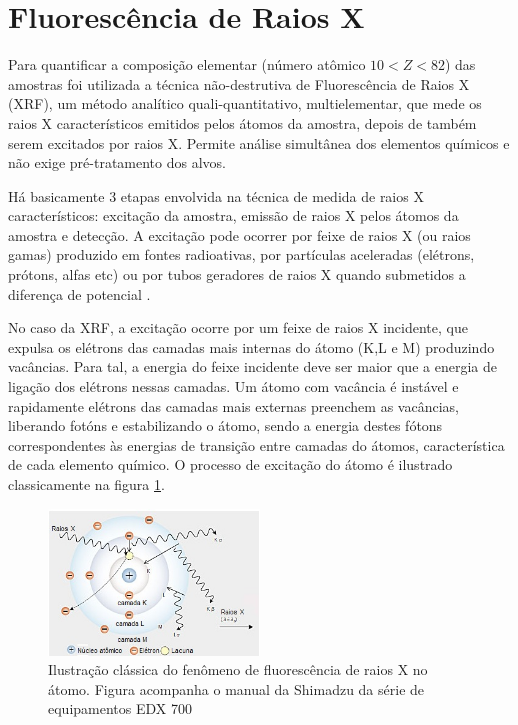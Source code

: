 \newpage
\section{Fluorescência de Raios X}

Para quantificar a composição elementar (número atômico $ 10 < Z < 82$) das 
amostras foi utilizada a técnica não-destrutiva de Fluorescência de Raios X 
(XRF), um método analítico quali-quantitativo, multielementar, 
que mede os raios X característicos emitidos pelos átomos da amostra, 
depois de também serem excitados por raios X. Permite análise simultânea dos 
elementos químicos e não exige pré-tratamento dos alvos.

Há basicamente 3 etapas envolvida na técnica de medida de raios X 
característicos: excitação da amostra, emissão de raios X pelos átomos da amostra
e detecção. A excitação pode ocorrer por feixe de raios X (ou raios gamas) 
produzido em fontes radioativas, por partículas aceleradas 
(elétrons, prótons, alfas etc) ou 
por tubos geradores de raios X quando submetidos a diferença de potencial
\citep{jenkins1988}. 

No caso da XRF, a excitação ocorre por um feixe de raios X incidente, que  
expulsa os elétrons das camadas mais internas do átomo (K,L e M) 
produzindo vacâncias. Para tal, a energia do feixe incidente deve ser maior 
que a energia de ligação dos elétrons nessas camadas. Um átomo com vacância é 
instável e rapidamente elétrons das camadas mais externas preenchem as vacâncias,
liberando fotóns e estabilizando o átomo, sendo a energia destes fótons 
correspondentes às energias de transição entre camadas do átomos, 
característica de cada elemento químico. O processo de excitação do átomo 
é ilustrado classicamente na figura \ref{fig:shimadzu_atomo}.

\begin{figure}[H]
  \centering
  \includegraphics[width=0.5\textwidth]{../inputs/images/shimadzu_atomo.jpg}
  \caption{Ilustração clássica do fenômeno de fluorescência de raios X no átomo. 
           Figura acompanha o manual da Shimadzu da série de equipamentos
           EDX 700 \label{fig:shimadzu_atomo}}
\end{figure}


